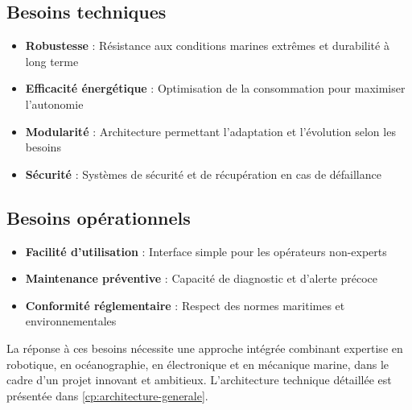 {\subsection{Besoins techniques}
\begin{itemize}
    \item \textbf{Robustesse} : Résistance aux conditions marines extrêmes et durabilité à long terme
    \item \textbf{Efficacité énergétique} : Optimisation de la consommation pour maximiser l'autonomie
    \item \textbf{Modularité} : Architecture permettant l'adaptation et l'évolution selon les besoins
    \item \textbf{Sécurité} : Systèmes de sécurité et de récupération en cas de défaillance
\end{itemize}

\subsection{Besoins opérationnels}
\begin{itemize}
    \item \textbf{Facilité d'utilisation} : Interface simple pour les opérateurs non-experts
    \item \textbf{Maintenance préventive} : Capacité de diagnostic et d'alerte précoce
    \item \textbf{Conformité réglementaire} : Respect des normes maritimes et environnementales
\end{itemize}

La réponse à ces besoins nécessite une approche intégrée combinant expertise en robotique, en océanographie, en électronique et en mécanique marine, dans le cadre d'un projet innovant et ambitieux. L'architecture technique détaillée est présentée dans \autoref{cp:architecture-generale}.

} 